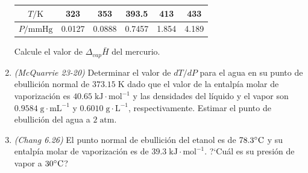 \documentclass[a4paper,12pt]{article}
\begin{document}
\begin{enumerate}
\begin{center}
\begin{tabular}{c | c c c c c}
 $T/\mbox{K}$ & 323 & 353 & 393.5 & 413 & 433 \\\hline
 $P/\mbox{mmHg}$ & 0.0127 & 0.0888 & 0.7457 & 1.854 & 4.189
\end{tabular}
\end{center}

Calcule el valor de $\Delta_{vap}\bar{H}$ del mercurio. %

 \item \textit{(McQuarrie 23-20)} Determinar el valor de $dT/dP$ para el agua en su punto de ebullici\'on normal de $373.15\;\mbox{K}$ dado que el valor de la entalp\'ia molar de vaporizaci\'on es $40.65\;\mbox{kJ}\cdot\mbox{mol}^{-1}$ y las densidades del l\'iquido y el vapor son $0.9584\;\mbox{g}\cdot\mbox{mL}^{-1}$ y $0.6010\;\mbox{g}\cdot\mbox{L}^{-1}$, respectivamente. Estimar el punto de ebullici\'on del agua a $2\;\mbox{atm}$. %

 \item \textit{(Chang 6.26)} El punto normal de ebullici\'on del etanol es de $78.3\celsius$ y su entalp\'ia molar de vaporizaci\'on es de $39.3\;\mbox{kJ}\cdot\mbox{mol}^{-1}$. ?`Cu\'al es su presi\'on de vapor a $30\celsius$? %

\end{enumerate}
 
\end{document}
